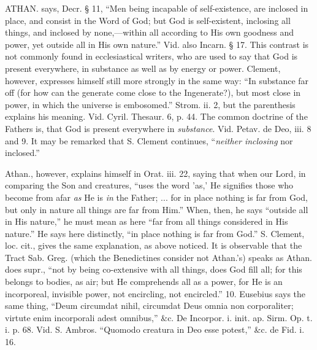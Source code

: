 
ATHAN.
says, Decr. § 11, ``Men being incapable of self-existence, are
inclosed in place, and consist in the Word of God; but God is
self-existent, inclosing all things, and inclosed by none,—within
all according to His own goodness and power, yet outside all in His
own nature.'' Vid. also Incarn. § 17. This contrast is not commonly
found in ecclesiastical writers, who are used to say that God is
present everywhere, in substance as well as by energy or power.
Clement, however, expresses himself still more strongly in the same
way: ``In substance far off (for how can the generate come close to the
Ingenerate?), but most close in power, in which the universe is
embosomed.'' Strom. ii. 2, but the parenthesis explains his meaning.
Vid. Cyril. Thesaur. 6, p. 44. The common doctrine of the Fathers is,
that God is present everywhere in \emph{substance}. Vid. Petav. de Deo,
iii. 8 and 9. It may be remarked that S. Clement continues, ``\emph{neither
inclosing} nor inclosed.''

Athan.,
however, explains himself in Orat. iii. 22, saying that when our Lord,
in comparing the Son and creatures, ``uses the word 'as,' He signifies
those who become from afar \emph{as} He is \emph{in} the Father; ...
for in place nothing is far from God, but only in nature all things
are far from Him.'' When, then, he says ``outside all in His
nature,'' he must mean as here ``far from all things considered in His
nature.'' He says here distinctly, ``in place nothing is far from God.''
S. Clement, loc. cit., gives the same explanation, as above noticed.
It is observable that the Tract Sab. Greg. (which the Benedictines
consider not Athan.'s) speaks as Athan. does supr., ``not by being
co-extensive with all things, does God fill all; for this belongs to
bodies, as air; but He comprehends all as a power, for He is an
incorporeal, invisible power, not encircling, not encircled.'' 10.
Eusebius says the same thing, ``Deum circumdat nihil, circumdat Deus
omnia non corporaliter; virtute enim incorporali adest omnibus,''
\&c. De Incorpor. i. init. ap. Sirm. Op. t. i. p. 68. Vid. S.
Ambros. ``Quomodo creatura in Deo esse potest,'' \&c. de Fid. i. 16.


